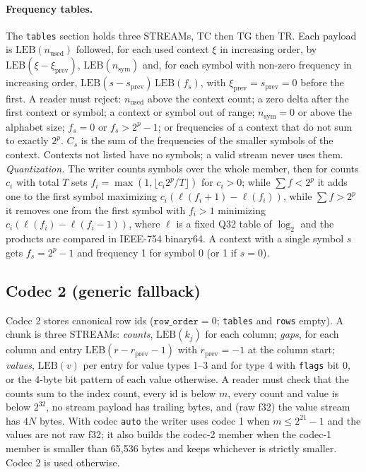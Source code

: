 \paragraph{Frequency tables.}
\label{spec:tables}
The \texttt{tables} section holds three STREAMs, TC then TG then TR. Each payload is $\mathrm{LEB}(n_{\mathrm{used}})$
followed, for each used context $\xi$ in increasing order, by $\mathrm{LEB}(\xi-\xi_{\mathrm{prev}})$,
$\mathrm{LEB}(n_{\mathrm{sym}})$ and, for each symbol with non-zero frequency in increasing order,
$\mathrm{LEB}(s-s_{\mathrm{prev}})\,\mathrm{LEB}(f_s)$, with $\xi_{\mathrm{prev}}=s_{\mathrm{prev}}=0$ before the first.
A reader must reject: $n_{\mathrm{used}}$ above the context count; a zero delta after the first context or symbol; a
context or symbol out of range; $n_{\mathrm{sym}}=0$ or above the alphabet size; $f_s=0$ or $f_s>2^{p}-1$; or
frequencies of a context that do not sum to exactly $2^{p}$. $C_s$ is the sum of the frequencies of the smaller symbols
of the context. Contexts not listed have no symbols; a valid stream never uses them.
\emph{Quantization.} The writer counts symbols over the whole member, then for counts $c_i$ with total
$T$ sets $f_i=\max(1,\lfloor c_i2^{p}/T\rfloor)$ for $c_i>0$; while $\sum f<2^{p}$ it adds one to the first symbol
maximizing $c_i(\ell(f_i+1)-\ell(f_i))$, while $\sum f>2^{p}$ it removes one from the first symbol with $f_i>1$
minimizing $c_i(\ell(f_i)-\ell(f_i-1))$, where $\ell$ is a fixed Q32 table of $\log_2$ and the products are compared in
IEEE-754 binary64. A context with a single symbol $s$ gets $f_s=2^{p}-1$ and frequency 1 for symbol 0 (or 1 if $s=0$).

\subsection{Codec 2 (generic fallback)}
\label{spec:codec2}
Codec 2 stores canonical row ids ($\texttt{row\_order}=0$; \texttt{tables} and \texttt{rows} empty). A chunk is three
STREAMs: \emph{counts}, $\mathrm{LEB}(k_j)$ for each column; \emph{gaps}, for each column and entry
$\mathrm{LEB}(r-r_{\mathrm{prev}}-1)$ with $r_{\mathrm{prev}}=-1$ at the column start; \emph{values}, $\mathrm{LEB}(v)$
per entry for value types 1--3 and for type 4 with \texttt{flags} bit 0, or the 4-byte bit pattern of each value
otherwise. A reader must check that the counts sum to the index count, every id is below $m$, every count and value is
below $2^{32}$, no stream payload has trailing bytes, and (raw f32) the value stream has $4N$ bytes.
With codec \texttt{auto} the writer uses codec 1 when $m\le2^{21}-1$ and the values are not raw
f32; it also builds the codec-2 member when the codec-1 member is smaller than 65{,}536 bytes and keeps whichever is
strictly smaller. Codec 2 is used otherwise.

